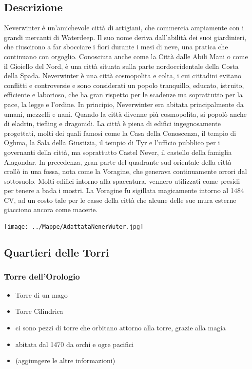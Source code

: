 \documentclass{article}
\begin{document}
          \subsection{Descrizione} Neverwinter è un’amichevole città di artigiani, che commercia ampiamente con i grandi mercanti di Waterdeep. Il suo nome deriva dall’abilità dei suoi giardinieri, che riuscirono a far sbocciare i fiori durante i mesi di neve, una pratica che continuano con orgoglio. Conosciuta anche come la Città dalle Abili Mani o come il Gioiello del Nord, è una città situata sulla parte nordoccidentale della Costa della Spada. Neverwinter è una città cosmopolita e colta, i cui cittadini evitano conflitti e controversie e sono considerati un popolo tranquillo, educato, istruito, efficiente e laborioso, che ha gran rispetto per le scadenze ma soprattutto per la pace, la legge e l’ordine. In principio, Neverwinter era abitata principalmente da umani, mezzelfi e nani. Quando la città divenne più cosmopolita, si popolò anche di eladrin, tiefling e dragonidi.
La città è piena di edifici ingegnosamente progettati, molti dei quali famosi come la Casa della Conoscenza, il tempio di Oghma, la Sala della Giustizia, il tempio di Tyr e l’ufficio pubblico per i governanti della città, ma soprattutto Castel Never, il castello della famiglia Alagondar. In precedenza, gran parte del quadrante sud-orientale della città crollò in una fossa, nota come la Voragine, che generava continuamente orrori dal sottosuolo. Molti edifici intorno alla spaccatura, vennero utilizzati come presidi per tenere a bada i mostri. La Voragine fu sigillata magicamente intorno al 1484 CV, ad un costo tale per le casse della città che alcune delle sue mura esterne giacciono ancora come macerie.




\begin{landscape}
        \texttt{[image: ../Mappe/AdattataNenerWuter.jpg]}
       
   
    
\end{landscape}

          \subsection{Quartieri delle Torri}
              \subsubsection{Torre dell'Orologio}
\begin{itemize}
    \item Torre di un mago
    \item Torre Cilindrica
    \item ci sono pezzi di torre che orbitano attorno alla torre, grazie alla magia
    \item abitata dal 1470 da orchi e ogre pacifici
    \item (aggiungere le altre informazioni)
\end{itemize}
\end{document}
